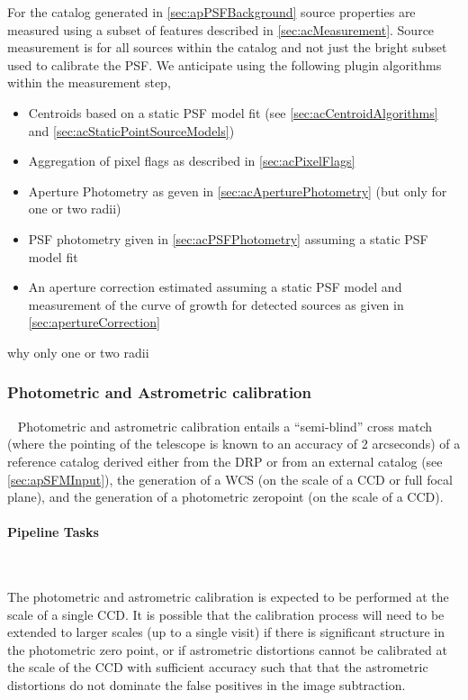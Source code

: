 For the \Source catalog generated in \ref{sec:apPSFBackground} source properties are measured using a subset of features described in \ref{sec:acMeasurement}. Source measurement is for all sources within the \Source catalog and not just the bright subset used to calibrate the PSF.  We anticipate using the following plugin algorithms within the \Source measurement step,
\begin{itemize}
\item Centroids based on a static PSF model fit (see \ref{sec:acCentroidAlgorithms} and \ref{sec:acStaticPointSourceModels})
\item Aggregation of pixel flags as described in \ref{sec:acPixelFlags}
\item Aperture Photometry as geven in \ref{sec:acAperturePhotometry} (but only for one or two radii) 
\item PSF photometry given in \ref{sec:acPSFPhotometry} assuming a static PSF model fit
\item  An aperture correction estimated assuming a static PSF model and measurement of the curve of growth for  detected sources as given in \ref{sec:apertureCorrection}
\end{itemize}

\begin{note} why only one or two radii \end{note}


\subsubsection{Photometric and Astrometric calibration}~ 
Photometric and astrometric calibration entails a ``semi-blind'' cross match (where the pointing of the telescope is known to an accuracy of 2 arcseconds) of a reference catalog derived either from the DRP \Objects or from an external catalog (see \ref{sec:apSFMInput}), the generation of a WCS (on the scale of a CCD or full focal plane), and the generation of a photometric zeropoint (on the scale of a CCD).

\paragraph{Pipeline Tasks}~

The photometric and astrometric calibration is expected to be performed at the scale of a single CCD. It is possible that the calibration process will need to be extended to larger scales (up to a single visit) if there is significant structure in the photometric zero point, or if astrometric distortions cannot be calibrated at the scale of the CCD with sufficient accuracy such that that the astrometric distortions do not dominate the false positives in the image subtraction.

